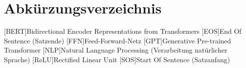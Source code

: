 \section*{Abk{\"u}rzungsverzeichnis}
\begin{acronym}[acro]
	[BERT]{Bidirectional Encoder Representations from Transformers}
	[EOS]{End Of Sentence (Satzende)}
	[FFN]{Feed-Forward-Netz}
	[GPT]{Generative Pre-trained Transformer}
	[NLP]{Natural Language Processing (Verarbeitung natürlicher Sprache)} 
	[ReLU]{Rectified Linear Unit}
	[SOS]{Start Of Sentence (Satzanfang)}
\end{acronym}